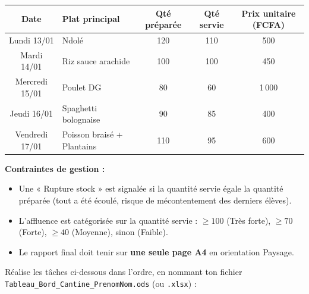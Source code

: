 \documentclass[11pt]{article}
\newcounter{popsec}
\newcounter{popsub}
\newcommand{\courssub}[1]{%
  \stepcounter{popsub}%
  \par\vspace{9pt}\noindent{\popxbold\fontsize{11.5}{13}\selectfont\color{popink}{\color{poporange}\thepopsec.\thepopsub}\hspace{6pt}#1}\par\nopagebreak\vspace{4pt}
}
\begin{document}
\begin{center}
\begin{tabularx}{\linewidth}{|c|X|c|c|c|}
\hline
\rowcolor{popblueL}
\textbf{Date} & \textbf{Plat principal} & \textbf{Qté préparée} & \textbf{Qté servie} & \textbf{Prix unitaire (FCFA)} \\
\hline
Lundi 13/01 & Ndolé & 120 & 110 & 500 \\
Mardi 14/01 & Riz sauce arachide & 100 & 100 & 450 \\
Mercredi 15/01 & Poulet DG & 80 & 60 & 1\,000 \\
Jeudi 16/01 & Spaghetti bolognaise & 90 & 85 & 400 \\
Vendredi 17/01 & Poisson braisé + Plantains & 110 & 95 & 600 \\
\hline
\end{tabularx}
\end{center}

\textbf{Contraintes de gestion :}
\begin{itemize}
    \item Une « Rupture stock » est signalée si la quantité servie égale la quantité préparée (tout a été écoulé, risque de mécontentement des derniers élèves).
    \item L'affluence est catégorisée sur la quantité servie : $\ge 100$ (Très forte), $\ge 70$ (Forte), $\ge 40$ (Moyenne), sinon (Faible).
    \item Le rapport final doit tenir sur \textbf{une seule page A4} en orientation Paysage.
\end{itemize}

\courssub{Consignes}
Réalise les tâches ci-dessous dans l'ordre, en nommant ton fichier \texttt{Tableau\_Bord\_Cantine\_PrenomNom.ods} (ou \texttt{.xlsx}) :
\end{document}

